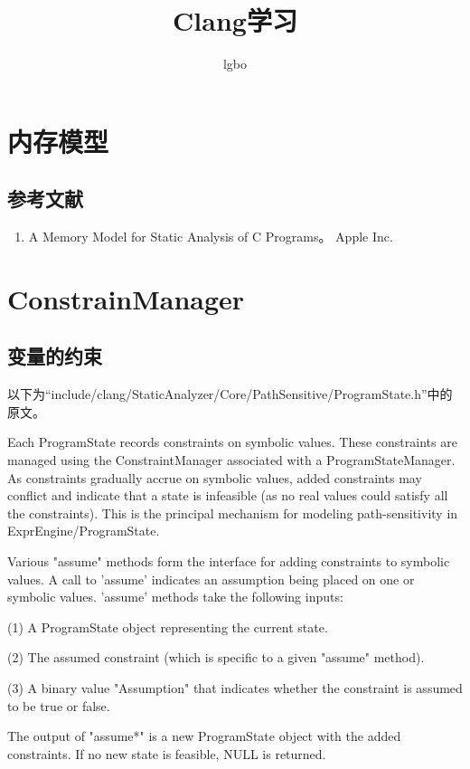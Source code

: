 \documentclass[a4paper]{article}
\title{Clang学习}
\author{lgbo}
\begin{document}
  \maketitle
  \tableofcontents
  \section{内存模型}
  \subsection{参考文献}
  \begin{enumerate}
    \item A Memory Model for Static Analysis of C Programs。 Apple Inc.
  \end{enumerate}
  \section{ConstrainManager}
  \subsection{变量的约束}
以下为“include/clang/StaticAnalyzer/Core/PathSensitive/ProgramState.h”中的原文。

  Each ProgramState records constraints on symbolic values.  These constraints
  are managed using the ConstraintManager associated with a ProgramStateManager.
  As constraints gradually accrue on symbolic values, added constraints
  may conflict and indicate that a state is infeasible (as no real values
  could satisfy all the constraints).  This is the principal mechanism
  for modeling path-sensitivity in ExprEngine/ProgramState.
  
  
  
   Various "assume" methods form the interface for adding constraints to
   symbolic values.  A call to 'assume' indicates an assumption being placed
   on one or symbolic values.  'assume' methods take the following inputs:
  
    (1) A ProgramState object representing the current state.
  
    (2) The assumed constraint (which is specific to a given "assume" method).
  
    (3) A binary value "Assumption" that indicates whether the constraint is
        assumed to be true or false.
  
  
   The output of "assume*" is a new ProgramState object with the added constraints.
   If no new state is feasible, NULL is returned.
   
\end{document}

